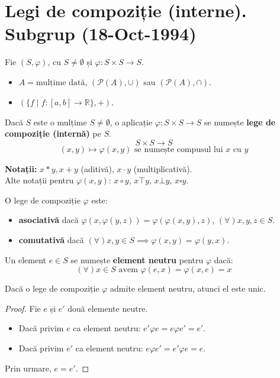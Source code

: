 \section{Legi de compoziție (interne). Subgrup (18-Oct-1994)}

Fie $(S, \varphi)$, cu $S \neq \emptyset$ și $\varphi: S \times S \to S$.

\begin{example}\leavevmode
\begin{itemize}
    \item $A = \text{mulțime dată}$, $(\mathcal{P}(A), \cup)$ sau $(\mathcal{P}(A), \cap)$.
    \item $(\{f \mid f: [a, b] \to \mathbb{R}\}, +)$.
\end{itemize}
\end{example}

\begin{definition}
Dacă $S$ este o mulțime $S \neq \emptyset$, o aplicație $\varphi: S \times S \to S$ se numește \textbf{lege de compoziție (internă)} pe $S$.
$$ S \times S \to S $$
$$ (x, y) \mapsto \varphi(x, y) \text{ se numește compusul lui } x \text{ cu } y $$
\end{definition}

\textbf{Notații:} $x * y, x + y$ (aditivă), $x \cdot y$ (multiplicativă). \\
Alte notații pentru $\varphi(x, y)$: $x \circ y$, $x \top y$, $x \bot y$, $x \square y$.

\begin{definition}[Proprietăți]
O lege de compoziție $\varphi$ este:
\begin{itemize}
    \item \textbf{asociativă} dacă $\varphi(x, \varphi(y, z)) = \varphi(\varphi(x, y), z)$, $(\forall) x, y, z \in S$.
    \item \textbf{comutativă} dacă $(\forall) x, y \in S \implies \varphi(x, y) = \varphi(y, x)$.
\end{itemize}
\end{definition}

\begin{definition}
Un element $e \in S$ se numește \textbf{element neutru} pentru $\varphi$ dacă:
$$ (\forall) x \in S \text{ avem } \varphi(e, x) = \varphi(x, e) = x $$
\end{definition}

\begin{proposition}
Dacă o lege de compoziție $\varphi$ admite element neutru, atunci el este unic.
\end{proposition}
\begin{proof}
Fie $e$ și $e'$ două elemente neutre.
\begin{itemize}
    \item Dacă privim $e$ ca element neutru: $e' \varphi e = e \varphi e' = e'$.
    \item Dacă privim $e'$ ca element neutru: $e \varphi e' = e' \varphi e = e$.
\end{itemize}
Prin urmare, $e = e'$.
\end{proof}

